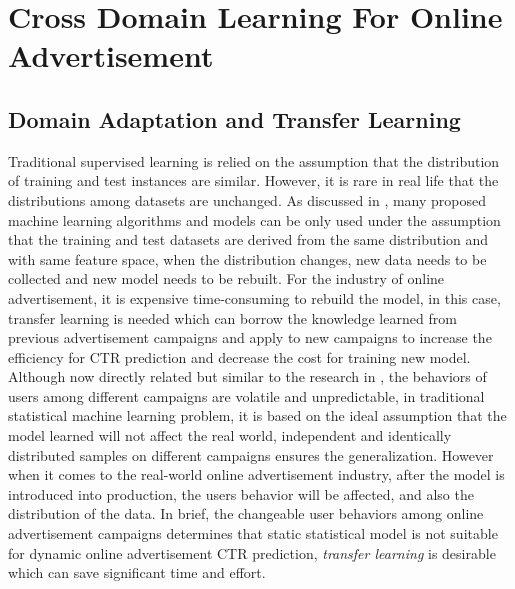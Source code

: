 \documentclass{sig-alternate}
\begin{document}
\section{Cross Domain Learning For Online Advertisement}
\subsection{Domain Adaptation and Transfer Learning}
Traditional supervised learning is relied on the assumption that the distribution of training and test instances are similar. However, it is rare in real life that the distributions among datasets are unchanged. As discussed in \cite{facebook2015}, many proposed machine learning algorithms and models can be only used under the assumption that the training and test datasets are derived from the same distribution and with same feature space, when the distribution changes, new data needs to be collected and new model needs to be rebuilt. For the industry of online advertisement, it is expensive time-consuming to rebuild the model, in this case, transfer learning is needed which can borrow the knowledge learned from previous advertisement campaigns and apply to new campaigns to increase the efficiency for CTR prediction and decrease the cost for training new model. Although now directly related but similar to the research in \cite{pan2008transfer}, the behaviors of users among different campaigns are volatile and unpredictable, in traditional statistical machine learning problem, it is based on the ideal assumption that the model learned will not affect the real world, independent and identically distributed samples on different campaigns ensures the generalization. However when it comes to the real-world online advertisement industry, after the model is introduced into production, the users behavior will be affected, and also the distribution of the data. In brief, the changeable user behaviors among online advertisement campaigns determines that static statistical model is not suitable for dynamic online advertisement CTR prediction, \textit{transfer learning} is desirable which can save significant time and effort. 
\end{document}
